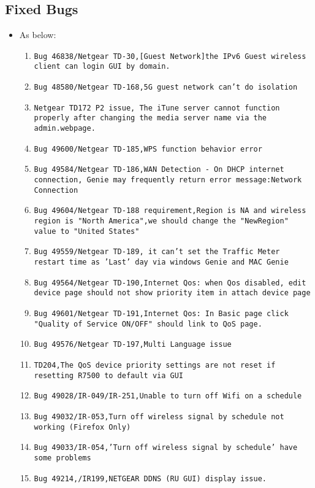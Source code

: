 \documentclass[12pt]{report}
\begin{document}
    \subsection{Fixed Bugs}
    \begin{itemize}
    \item As below:
    	\begin{enumerate}
		\item \texttt{Bug 46838/Netgear TD-30,[Guest Network]the IPv6 Guest wireless client can login GUI by domain.}
		\item \texttt{Bug 48580/Netgear TD-168,5G guest network can't do isolation}
		\item \texttt{Netgear TD172 P2 issue, The iTune server cannot function properly after changing the media server name via the admin.webpage.}
		\item \texttt{Bug 49600/Netgear TD-185,WPS function behavior error }
		\item \texttt{Bug 49584/Netgear TD-186,WAN Detection - On DHCP internet connection, Genie may frequently return error message:Network Connection}
		\item \texttt{Bug 49604/Netgear TD-188 requirement,Region is NA and wireless region is "North America",we should change the "NewRegion" value to "United States"}
		\item \texttt{Bug 49559/Netgear TD-189, it can't set the Traffic Meter restart time as 'Last' day via windows Genie and MAC Genie}
		\item \texttt{Bug 49564/Netgear TD-190,Internet Qos: when Qos disabled, edit device page should not show priority item in attach device page}
		\item \texttt{Bug 49601/Netgear TD-191,Internet Qos: In Basic page click "Quality of Service ON/OFF" should link to QoS page.}
		\item \texttt{Bug 49576/Netgear TD-197,Multi Language issue}
		\item \texttt{TD204,The QoS device priority settings are not reset if resetting R7500 to default via GUI}
		\item \texttt{Bug 49028/IR-049/IR-251,Unable to turn off Wifi on a schedule }
		\item \texttt{Bug 49032/IR-053,Turn off wireless signal by schedule not working (Firefox Only) }
		\item \texttt{Bug 49033/IR-054,'Turn off wireless signal by schedule' have some problems }
		\item \texttt{Bug 49214,/IR199,NETGEAR DDNS (RU GUI) display issue.}

\end{enumerate}
\end{itemize}
\end{document}
